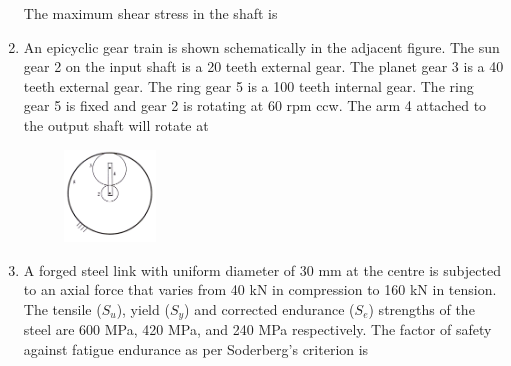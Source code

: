 \documentclass[journal]{IEEEtran}
\begin{document}
\begin{enumerate}[leftmargin=0pt]
The maximum shear stress in the shaft is

\begin{enumerate}
\hfill{}
\end{enumerate}




\item An epicyclic gear train is shown schematically in the adjacent figure. The sun gear 2 on the input shaft is a 20 teeth external gear. The planet gear 3 is a 40 teeth external gear. The ring gear 5 is a 100 teeth internal gear. The ring gear 5 is fixed and gear 2 is rotating at 60 rpm ccw. The arm 4 attached to the output shaft will rotate at
\begin{figure}[h] 
  \centering
  \includegraphics[width=0.23\textwidth]{Figs/image (8).png}
  \caption{}
  \label{fig:36}
\end{figure}

\begin{enumerate}
\hfill{}
\end{enumerate}

\item A forged steel link with uniform diameter of 30 mm at the centre is subjected to an axial force that varies from 40 kN in compression to 160 kN in tension. The tensile ($S_u$), yield ($S_y$) and corrected endurance ($S_e$) strengths of the steel are 600 MPa, 420 MPa, and 240 MPa respectively. The factor of safety against fatigue endurance as per Soderberg's criterion is
\begin{enumerate}
\hfill{}
\end{enumerate}


\end{enumerate}
\end{document}
